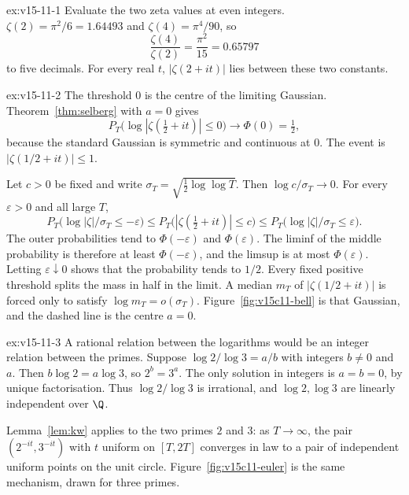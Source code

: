 \begin{solution}{ex:v15-11-1}
\idea Evaluate the two zeta values at even integers.
\writeup \(\zeta(2)=\pi^2/6=1.64493\) and \(\zeta(4)=\pi^4/90\), so
\[
\frac{\zeta(4)}{\zeta(2)}=\frac{\pi^2}{15}=0.65797
\]
to five decimals. For every real \(t\), \(|\zeta(2+it)|\) lies between these two constants.
\end{solution}

\begin{solution}{ex:v15-11-2}
\idea The threshold \(0\) is the centre of the limiting Gaussian.
\writeup Theorem~\ref{thm:selberg} with \(a=0\) gives
\[
P_T\bigl(\log|\zeta(\tfrac12+it)|\le0\bigr)\to\Phi(0)=\tfrac12,
\]
because the standard Gaussian is symmetric and continuous at \(0\). The event is \(|\zeta(1/2+it)|\le1\).

Let \(c>0\) be fixed and write \(\sigma_T=\sqrt{\tfrac12\log\log T}\). Then \(\log c/\sigma_T\to0\). For every \(\varepsilon>0\) and all large \(T\),
\[
P_T\bigl(\log|\zeta|/\sigma_T\le-\varepsilon\bigr)
\le P_T\bigl(|\zeta(\tfrac12+it)|\le c\bigr)
\le P_T\bigl(\log|\zeta|/\sigma_T\le\varepsilon\bigr).
\]
The outer probabilities tend to \(\Phi(-\varepsilon)\) and \(\Phi(\varepsilon)\). The liminf of the middle probability is therefore at least \(\Phi(-\varepsilon)\), and the limsup is at most \(\Phi(\varepsilon)\). Letting \(\varepsilon\downarrow0\) shows that the probability tends to \(1/2\). Every fixed positive threshold splits the mass in half in the limit. A median \(m_T\) of \(|\zeta(1/2+it)|\) is forced only to satisfy \(\log m_T=o(\sigma_T)\). Figure~\ref{fig:v15c11-bell} is that Gaussian, and the dashed line is the centre \(a=0\).
\end{solution}

\begin{solution}{ex:v15-11-3}
\idea A rational relation between the logarithms would be an integer relation between the primes.
\writeup Suppose \(\log2/\log3=a/b\) with integers \(b\ne0\) and \(a\). Then \(b\log2=a\log3\), so \(2^b=3^a\). The only solution in integers is \(a=b=0\), by unique factorisation. Thus \(\log2/\log3\) is irrational, and \(\log2,\log3\) are linearly independent over \(\Q\).

Lemma~\ref{lem:kw} applies to the two primes \(2\) and \(3\): as \(T\to\infty\), the pair \((2^{-it},3^{-it})\) with \(t\) uniform on \([T,2T]\) converges in law to a pair of independent uniform points on the unit circle. Figure~\ref{fig:v15c11-euler} is the same mechanism, drawn for three primes.
\end{solution}

